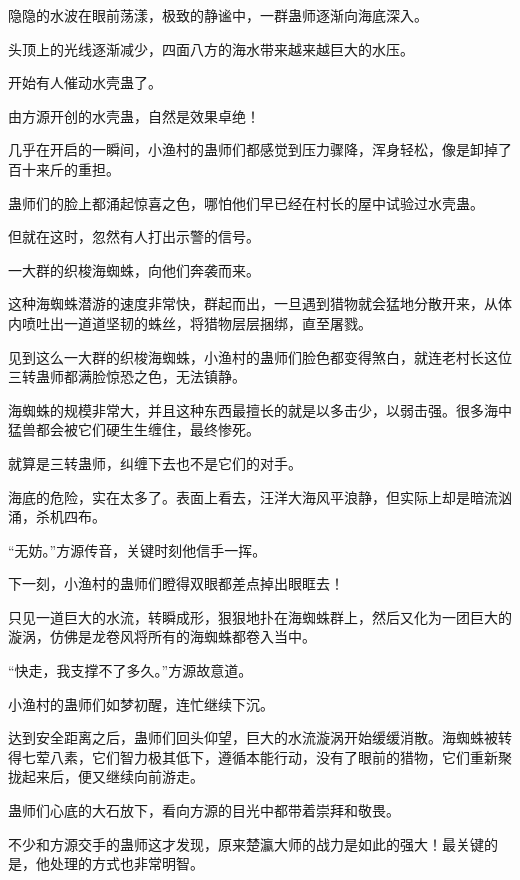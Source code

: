 
\begin{this_body}

隐隐的水波在眼前荡漾，极致的静谧中，一群蛊师逐渐向海底深入。

头顶上的光线逐渐减少，四面八方的海水带来越来越巨大的水压。

开始有人催动水壳蛊了。

由方源开创的水壳蛊，自然是效果卓绝！

几乎在开启的一瞬间，小渔村的蛊师们都感觉到压力骤降，浑身轻松，像是卸掉了百十来斤的重担。

蛊师们的脸上都涌起惊喜之色，哪怕他们早已经在村长的屋中试验过水壳蛊。

但就在这时，忽然有人打出示警的信号。

一大群的织梭海蜘蛛，向他们奔袭而来。

这种海蜘蛛潜游的速度非常快，群起而出，一旦遇到猎物就会猛地分散开来，从体内喷吐出一道道坚韧的蛛丝，将猎物层层捆绑，直至屠戮。

见到这么一大群的织梭海蜘蛛，小渔村的蛊师们脸色都变得煞白，就连老村长这位三转蛊师都满脸惊恐之色，无法镇静。

海蜘蛛的规模非常大，并且这种东西最擅长的就是以多击少，以弱击强。很多海中猛兽都会被它们硬生生缠住，最终惨死。

就算是三转蛊师，纠缠下去也不是它们的对手。

海底的危险，实在太多了。表面上看去，汪洋大海风平浪静，但实际上却是暗流汹涌，杀机四布。

“无妨。”方源传音，关键时刻他信手一挥。

下一刻，小渔村的蛊师们瞪得双眼都差点掉出眼眶去！

只见一道巨大的水流，转瞬成形，狠狠地扑在海蜘蛛群上，然后又化为一团巨大的漩涡，仿佛是龙卷风将所有的海蜘蛛都卷入当中。

“快走，我支撑不了多久。”方源故意道。

小渔村的蛊师们如梦初醒，连忙继续下沉。

达到安全距离之后，蛊师们回头仰望，巨大的水流漩涡开始缓缓消散。海蜘蛛被转得七荤八素，它们智力极其低下，遵循本能行动，没有了眼前的猎物，它们重新聚拢起来后，便又继续向前游走。

蛊师们心底的大石放下，看向方源的目光中都带着崇拜和敬畏。

不少和方源交手的蛊师这才发现，原来楚瀛大师的战力是如此的强大！最关键的是，他处理的方式也非常明智。


\end{this_body}
